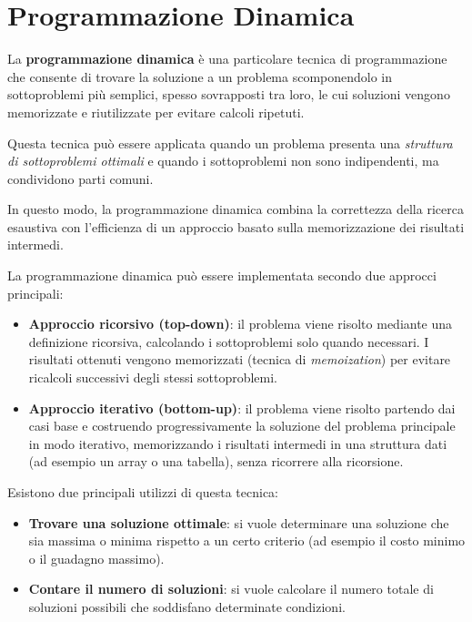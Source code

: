 
\chapter{Programmazione Dinamica}

La \textbf{programmazione dinamica} è una particolare tecnica di programmazione che consente di trovare la soluzione a un problema scomponendolo in sottoproblemi più semplici, spesso sovrapposti tra loro, le cui soluzioni vengono memorizzate e riutilizzate per evitare calcoli ripetuti.

Questa tecnica può essere applicata quando un problema presenta una \textit{struttura di sottoproblemi ottimali} e quando i sottoproblemi non sono indipendenti, ma condividono parti comuni.

In questo modo, la programmazione dinamica combina la correttezza della ricerca esaustiva con l’efficienza di un approccio basato sulla memorizzazione dei risultati intermedi.

La programmazione dinamica può essere implementata secondo due approcci principali:

\begin{itemize}
	\item \textbf{Approccio ricorsivo (top-down)}: il problema viene risolto mediante una definizione ricorsiva, calcolando i sottoproblemi solo quando necessari. I risultati ottenuti vengono memorizzati (tecnica di \textit{memoization}) per evitare ricalcoli successivi degli stessi sottoproblemi.
	
	\item \textbf{Approccio iterativo (bottom-up)}: il problema viene risolto partendo dai casi base e costruendo progressivamente la soluzione del problema principale in modo iterativo, memorizzando i risultati intermedi in una struttura dati (ad esempio un array o una tabella), senza ricorrere alla ricorsione.
\end{itemize}

Esistono due principali utilizzi di questa tecnica:
\begin{itemize}
	\item \textbf{Trovare una soluzione ottimale}: si vuole determinare una soluzione che sia massima o minima rispetto a un certo criterio (ad esempio il costo minimo o il guadagno massimo).
	\item \textbf{Contare il numero di soluzioni}: si vuole calcolare il numero totale di soluzioni possibili che soddisfano determinate condizioni.
\end{itemize}

